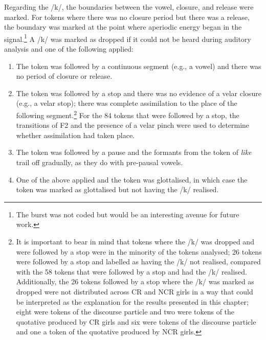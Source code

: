 
Regarding the /k/, the boundaries between the vowel, closure, and release were marked.  For tokens where there was no closure period but there was a release, the boundary was marked at the point where aperiodic energy began in the signal.\footnote{The burst was not coded but would be an interesting avenue for future work.}  A /k/ was marked as dropped if it could not be heard during auditory analysis and one of the following applied:

\begin{enumerate}
	\item The token was followed by a continuous segment (e.g., a vowel) and there was no period of closure or release.
	\item The token was followed by a stop and there was no evidence of a velar closure (e.g., a velar stop); there was complete assimilation to the place of the following segment.\footnote{It is important to bear in mind that tokens where the /k/ was dropped and were followed by a stop were in the minority of the tokens analysed; 26 tokens were followed by a stop and labelled as having the /k/ not realised, compared with the 58 tokens that were followed by a stop and had the /k/ realised.  Additionally, the 26 tokens followed by a stop where the /k/ was marked as dropped were not distributed across CR and NCR girls in a way that could be interpreted as the explanation for the results presented in this chapter; eight were tokens of the discourse particle and two were tokens of the quotative produced by CR girls and six were tokens of the discourse particle and one a token of the quotative produced by NCR girls.}  For the 84 tokens that were followed by a stop, the transitions of F2 and the presence of a velar pinch \cite[89]{harringtoncassidy1999} were used to determine whether assimilation had taken place.
	\item The token was followed by a pause and the formants from the token of \textit{like} trail off gradually, as they do with pre-pausal vowels.
	\item One of the above applied and the token was glottalised, in which case the token was marked as glottalised but not having the /k/ realised.
\end{enumerate}

